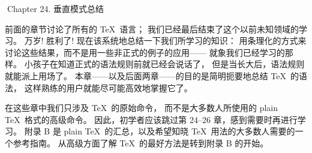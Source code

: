 


\beginchapter Chapter 24. 垂直模式总结


\1前面的章节讨论了所有的 \TeX\ 语言；
我们已经最后结束了这个以前未知领域的学习。%
万岁! 胜利了!
现在该系统地总结一下我们所学习的知识：
用条理化的方式来讨论这些结果，而不是用一些非正式的例子的应用——%
就象我们已经学习的那样。%
小孩子在知道正式的语法规则前就已经会说话了，
但是当长大后，语法规则就能派上用场了。%
本章——以及后面两章——的目的是简明扼要地总结 \TeX\ 的语法，
这样熟练的用户就能尽可能高效地掌握它了。

在这些章中我们只涉及 \TeX\ 的{原始}命令，
而不是大多数人所使用的 plain \TeX\ 格式的高级命令。%
因此，初学者应该跳过第 24--26 章，感到需要时再进行学习。%
附录 B 是 plain \TeX\ 的汇总，以及希望知晓 \TeX\ 用法的大多数人需要的一个参考指南。%
从高级方面了解 \TeX\ 的最好方法是转到附录 B 的开始。

